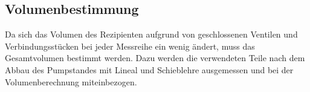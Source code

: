 \subsection{Volumenbestimmung}
Da sich das Volumen des Rezipienten aufgrund von geschlossenen Ventilen und Verbindungsstücken
bei jeder Messreihe ein wenig ändert, muss das Gesamtvolumen bestimmt werden. Dazu werden
die verwendeten Teile nach dem Abbau des Pumpstandes mit Lineal und Schieblehre ausgemessen
und bei der Volumenberechnung miteinbezogen.
